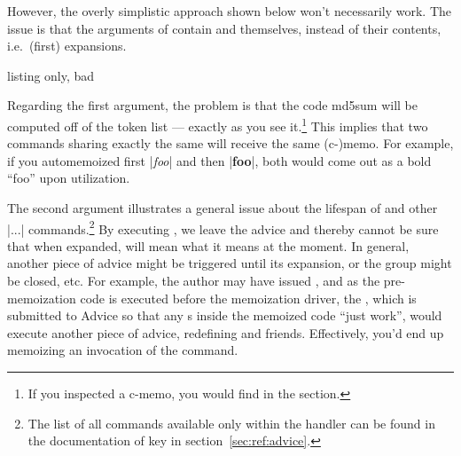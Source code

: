 \documentclass[a4paper,11pt]{article}
\begin{document}
However, the overly simplistic approach shown below won't necessarily work.
The issue is that the arguments of  contain
 and  themselves, instead of their
contents, i.e.\ (first) expansions.

\begin{tcblisting}{listing only, bad}
\long\def\mmz@auto@memoize#1{%
  \Memoize{\AdviceReplaced#1}{\AdviceOriginal#1}%
}
\end{tcblisting}

Regarding the first argument, the problem is that the code md5sum will be
computed off of the token list  ---
exactly as you see it.\footnote{If you inspected a c-memo, you would find
   in the  section.}
This implies that two commands sharing exactly the same  will
receive the same (c-)memo.  For example, if you automemoized first
|\textit{foo}| and then |\textbf{foo}|, both would come out as a bold ``foo''
upon utilization.

The second argument illustrates a general issue about the lifespan of
 and other |\Advice...| commands.\footnote{The list of
  all commands available only within the handler can be found in the
  documentation of key  in
  section~\ref{sec:ref:advice}.}  By executing , we leave the
advice and thereby cannot be sure that when expanded, 
will mean what it means at the moment.  In general, another piece of advice might be
triggered until its expansion, or the group might be closed, etc.  For example,
the author may have issued , and as the pre-memoization code is
executed before the memoization driver, the , which is submitted to
Advice so that any s inside the memoized code ``just work'', would
execute another piece of advice, redefining  and friends.
Effectively, you'd end up memoizing an invocation of the  command.
\end{document}

